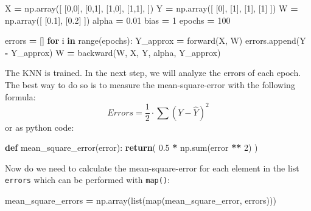 \documentclass[
]{book}
\newenvironment{Shaded}{\begin{snugshade}}{\end{snugshade}}
\newcommand{\BuiltInTok}[1]{#1}
\newcommand{\ControlFlowTok}[1]{\textcolor[rgb]{0.13,0.29,0.53}{\textbf{#1}}}
\newcommand{\DecValTok}[1]{\textcolor[rgb]{0.00,0.00,0.81}{#1}}
\newcommand{\FloatTok}[1]{\textcolor[rgb]{0.00,0.00,0.81}{#1}}
\newcommand{\KeywordTok}[1]{\textcolor[rgb]{0.13,0.29,0.53}{\textbf{#1}}}
\newcommand{\NormalTok}[1]{#1}
\newcommand{\OperatorTok}[1]{\textcolor[rgb]{0.81,0.36,0.00}{\textbf{#1}}}
\begin{document}
\begin{Shaded}
\begin{Highlighting}[]
\NormalTok{X }\OperatorTok{=}\NormalTok{ np.array([}
\NormalTok{  [}\DecValTok{0}\NormalTok{,}\DecValTok{0}\NormalTok{],}
\NormalTok{  [}\DecValTok{0}\NormalTok{,}\DecValTok{1}\NormalTok{],}
\NormalTok{  [}\DecValTok{1}\NormalTok{,}\DecValTok{0}\NormalTok{],}
\NormalTok{  [}\DecValTok{1}\NormalTok{,}\DecValTok{1}\NormalTok{],}
\NormalTok{])}
\NormalTok{Y }\OperatorTok{=}\NormalTok{ np.array([}
\NormalTok{  [}\DecValTok{0}\NormalTok{],}
\NormalTok{  [}\DecValTok{1}\NormalTok{],}
\NormalTok{  [}\DecValTok{1}\NormalTok{],}
\NormalTok{  [}\DecValTok{1}\NormalTok{]}
\NormalTok{])}
\NormalTok{W }\OperatorTok{=}\NormalTok{ np.array([}
\NormalTok{  [}\FloatTok{0.1}\NormalTok{], }
\NormalTok{  [}\FloatTok{0.2}\NormalTok{]}
\NormalTok{])}
\NormalTok{alpha }\OperatorTok{=} \FloatTok{0.01}
\NormalTok{bias }\OperatorTok{=} \DecValTok{1}
\NormalTok{epochs }\OperatorTok{=} \DecValTok{100}

\NormalTok{errors }\OperatorTok{=}\NormalTok{ []}
\ControlFlowTok{for}\NormalTok{ i }\KeywordTok{in} \BuiltInTok{range}\NormalTok{(epochs):}
\NormalTok{  Y\_approx }\OperatorTok{=}\NormalTok{ forward(X, W)}
\NormalTok{  errors.append(Y }\OperatorTok{{-}}\NormalTok{ Y\_approx)}
\NormalTok{  W }\OperatorTok{=}\NormalTok{ backward(W, X, Y, alpha, Y\_approx)}
\end{Highlighting}
\end{Shaded}

The KNN is trained. In the next step, we will analyze the errors of each epoch. The best way to do so is to measure the mean-square-error with the following formula:
\[
  Errors = \frac{1}{2} \cdot \sum(Y-\hat{Y})^2
\]
or as python code:

\begin{Shaded}
\begin{Highlighting}[]
\KeywordTok{def}\NormalTok{ mean\_square\_error(error):}
  \ControlFlowTok{return}\NormalTok{( }\FloatTok{0.5} \OperatorTok{*}\NormalTok{ np.}\BuiltInTok{sum}\NormalTok{(error }\OperatorTok{**} \DecValTok{2}\NormalTok{) )}
\end{Highlighting}
\end{Shaded}

Now do we need to calculate the mean-square-error for each element in the list \texttt{errors} which can be performed with \texttt{map()}:

\begin{Shaded}
\begin{Highlighting}[]
\NormalTok{mean\_square\_errors }\OperatorTok{=}\NormalTok{ np.array(}\BuiltInTok{list}\NormalTok{(}\BuiltInTok{map}\NormalTok{(mean\_square\_error, errors)))}
\end{Highlighting}
\end{Shaded}
\end{document}
